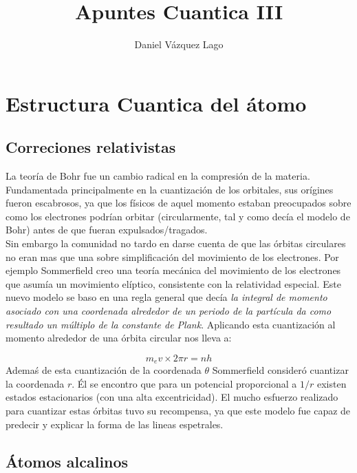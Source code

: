 \documentclass[12pt,a4paper]{article}
\title{Apuntes Cuantica III}
\author{Daniel Vázquez Lago}
\numberwithin{equation}{section}
\numberwithin{figure}{section}
\begin{document}
\maketitle

\newpage

\tableofcontents

\newpage

\section{Estructura Cuantica del átomo}

\subsection{Correciones relativistas}

La teoría de Bohr fue un cambio radical en la compresión de la materia. Fundamentada principalmente en la cuantización de los orbitales, sus orígines fueron escabrosos, ya que los físicos de aquel momento estaban preocupados sobre como los electrones podrían orbitar (circularmente, tal y como decía el modelo de Bohr) antes de que fueran expulsados/tragados. \\

Sin embargo la comunidad no tardo en darse cuenta de que las órbitas circulares no eran mas que una sobre simplificación del movimiento de los electrones. Por ejemplo Sommerfield creo una teoría mecánica del movimiento de los electrones que asumía un movimiento elíptico, consistente con la relatividad especial. Este nuevo modelo se baso en una regla general que decía \textit{la integral de momento asociado con una coordenada alrededor de un periodo de la partícula da como resultado un múltiplo de la constante de Plank}. Aplicando esta cuantización al momento alrededor de una órbita circular nos lleva a:

\begin{equation}
    m_e v \times 2 \pi r = n h
\end{equation}
Ademaś de esta cuantización de la coordenada $\theta$ Sommerfield consideró cuantizar la coordenada $r$. Él se encontro que para un potencial proporcional a $1/r$ existen estados estacionarios (con una alta excentricidad). El mucho esfuerzo realizado para cuantizar estas órbitas tuvo su recompensa, ya que este modelo fue capaz de predecir y explicar la forma de las lineas espetrales. 

\subsection{Átomos alcalinos}
\end{document}
